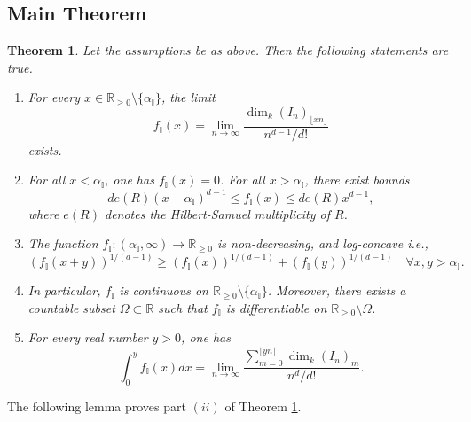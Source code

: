 \documentclass[12pt,a4paper]{amsart}
\theoremstyle{plain}
\newtheorem{theorem}{Theorem}[section]
\theoremstyle{definition}
\numberwithin{equation}{theorem}
\begin{document}
\subsection{Main Theorem}

\begin{theorem}\label{mainthm}
Let the assumptions be as above. Then the following statements are true.
\begin{enumerate}[$(i)$]
 \item For every $x\in \mathbb{R}_{\geq 0}\setminus\{\alpha_{\mathbb{I}}\}$, the limit $$f_{\mathbb{I}}(x) = \lim_{n\to\infty}\dfrac{\dim_k {\left(I_n\right)}_{\lfloor xn \rfloor}}{n^{d-1}/d!}$$ exists.
 \item For all $x<\alpha_{\mathbb{I}}$, one has $f_{\mathbb{I}}(x) = 0$. For all $x>\alpha_{\mathbb{I}}$, there exist bounds $$de(R)(x-\alpha_{\mathbb{I}})^{d-1} \leq f_{\mathbb{I}}(x) \leq de(R)x^{d-1},$$ where $e(R)$ denotes the Hilbert-Samuel multiplicity of $R$.
 \item The function $f_{\mathbb{I}}\colon (\alpha_{\mathbb{I}},\infty) \to \mathbb{R}_{\geq 0}$ is non-decreasing, and log-concave i.e., $${\left(f_{\mathbb{I}}(x+y)\right)}^{1/(d-1)} \geq {\left(f_{\mathbb{I}}(x)\right)}^{1/(d-1)} + {\left(f_{\mathbb{I}}(y)\right)}^{1/(d-1)} \quad \forall x,y>\alpha_{\mathbb{I}}.$$
 \item In particular, $f_{\mathbb{I}}$ is continuous on $\mathbb{R}_{\geq 0}\setminus \{\alpha_{\mathbb{I}}\}$. Moreover, there exists a countable subset $\Omega\subset \mathbb{R}$ such that $f_{\mathbb{I}}$ is differentiable on $\mathbb{R}_{\geq 0}\setminus \Omega$.
 \item For every real number $y>0$, one has $$\int_0^{y} f_{\mathbb{I}}(x)dx = \lim_{n\to\infty}\dfrac{\sum_{m=0}^{\lfloor yn\rfloor}\dim_k {\left(I_n\right)}_m}{n^d/d!}.$$
\end{enumerate}
\end{theorem}

The following lemma proves part $(ii)$ of Theorem \ref{mainthm}.
\end{document}
